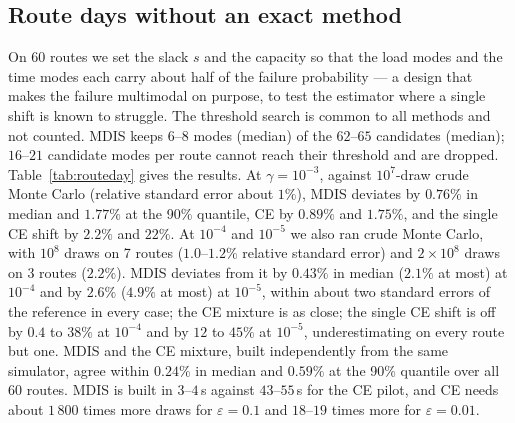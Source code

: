 \documentclass[11pt]{article}
\theoremstyle{definition}
\theoremstyle{remark}
\begin{document}
\subsection{Route days without an exact method}
\label{sec:routeday}
On 60 routes we set the slack $s$ and the capacity so that the load modes and
the time modes each carry about half of the failure probability --- a design
that makes the failure multimodal on purpose, to test the estimator where a
single shift is known to struggle. The threshold search is common to all
methods and not counted. MDIS keeps $6$--$8$ modes (median) of the $62$--$65$
candidates (median); $16$--$21$ candidate modes per route cannot reach their threshold
and are dropped. Table~\ref{tab:routeday} gives the results. At
$\gamma=10^{-3}$, against $10^7$-draw crude Monte Carlo (relative standard
error about $1\%$), MDIS deviates by $0.76\%$ in median and $1.77\%$ at the 90\%
quantile, CE by $0.89\%$ and $1.75\%$, and the single CE shift by $2.2\%$ and
$22\%$. At $10^{-4}$ and $10^{-5}$ we also ran crude Monte Carlo, with $10^8$
draws on 7 routes ($1.0$--$1.2\%$ relative standard error) and $2\times10^8$
draws on 3 routes ($2.2\%$). MDIS deviates from it by $0.43\%$ in median
($2.1\%$ at most) at $10^{-4}$ and by $2.6\%$ ($4.9\%$ at most) at $10^{-5}$,
within about two standard errors of the reference in every case; the CE
mixture is as close; the single CE shift is off by $0.4$ to $38\%$ at
$10^{-4}$ and by $12$ to $45\%$ at $10^{-5}$, underestimating on every route
but one. MDIS and the CE mixture, built independently from the same
simulator, agree within $0.24\%$ in median and $0.59\%$ at the 90\%
quantile over all 60 routes. MDIS is built in $3$--$4$\,s against
$43$--$55$\,s for the CE pilot, and CE needs about $1\,800$ times more draws for
$\varepsilon=0.1$ and $18$--$19$ times more for $\varepsilon=0.01$.

\begin{table}[t]
\centering\small
\caption{Route-day simulator, 60 routes: deviation (median / 90\% quantile),
relative variance (median), build time (median).}
\label{tab:routeday}
\end{table}
\end{document}
